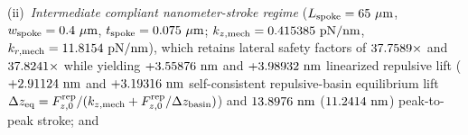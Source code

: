 (ii)~\emph{Intermediate compliant nanometer-stroke regime} ($L_{\rm spoke} = \NatureRotCeightCompactNtwoLateralStabilityNmActuatorLSpokeUm{}\ \mu\text{m}$, $w_{\rm spoke} = \NatureRotCeightCompactNtwoLateralStabilityNmActuatorWSpokeUm{}\ \mu\text{m}$, $t_{\rm spoke} = \NatureRotCeightCompactNtwoLateralStabilityNmActuatorTSpokeUm{}\ \mu\text{m}$; $k_{z,\rm mech} = 0.415385{}\text{ pN/nm}$, $k_{r,\rm mech} = 11.8154{}\text{ pN/nm}$), which retains lateral safety factors of $37.7589{}\times$ and $37.8241{}\times$ while yielding $+3.55876{}\text{ nm}$ and $+3.98932{}\text{ nm}$ linearized repulsive lift ($+2.91124{}\text{ nm}$ and $+3.19316{}\text{ nm}$ self-consistent repulsive-basin equilibrium lift $\Delta z_{\rm eq} = F_{z,0}^{\rm rep}/(k_{z,\rm mech} + F_{z,0}^{\rm rep}/\Delta z_{\rm basin})$) and $13.8976{}\text{ nm}$ ($11.2414{}\text{ nm}$) peak-to-peak stroke; and
